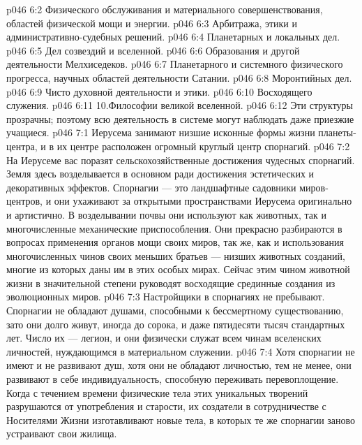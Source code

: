 \vs p046 6:2 \bibnobreakspace Физического обслуживания и материального совершенствования, областей физической мощи и энергии.
\vs p046 6:3 \bibnobreakspace Арбитража, этики и административно\hyp{}судебных решений.
\vs p046 6:4 \bibnobreakspace Планетарных и локальных дел.
\vs p046 6:5 \bibnobreakspace Дел созвездий и вселенной.
\vs p046 6:6 \bibnobreakspace Образования и другой деятельности Мелхиседеков.
\vs p046 6:7 \bibnobreakspace Планетарного и системного физического прогресса, научных областей деятельности Сатании.
\vs p046 6:8 \bibnobreakspace Моронтийных дел.
\vs p046 6:9 \bibnobreakspace Чисто духовной деятельности и этики.
\vs p046 6:10 \bibnobreakspace Восходящего служения.
\vs p046 6:11 10.Философии великой вселенной.
\vs p046 6:12 \pc Эти структуры прозрачны; поэтому всю деятельность в системе могут наблюдать даже приезжие учащиеся.
\vs p046 7:1  Иерусема занимают низшие исконные формы жизни планеты\hyp{}центра, и в их центре расположен огромный круглый центр спорнагий.
\vs p046 7:2 На Иерусеме вас поразят сельскохозяйственные достижения чудесных спорнагий. Земля здесь возделывается в основном ради достижения эстетических и декоративных эффектов. Спорнагии --- это ландшафтные садовники миров\hyp{}центров, и они ухаживают за открытыми пространствами Иерусема оригинально и артистично. В возделывании почвы они используют как животных, так и многочисленные механические приспособления. Они прекрасно разбираются в вопросах применения органов мощи своих миров, так же, как и использования многочисленных чинов своих меньших братьев --- низших животных созданий, многие из которых даны им в этих особых мирах. Сейчас этим чином животной жизни в значительной степени руководят восходящие срединные создания из эволюционных миров.
\vs p046 7:3 Настройщики в спорнагиях не пребывают. Спорнагии не обладают душами, способными к бессмертному существованию, зато они долго живут, иногда до сорока, и даже пятидесяти тысяч стандартных лет. Число их --- легион, и они физически служат всем чинам вселенских личностей, нуждающимся в материальном служении.
\vs p046 7:4 \pc Хотя спорнагии не имеют и не развивают душ, хотя они не обладают личностью, тем не менее, они развивают в себе индивидуальность, способную переживать перевоплощение. Когда с течением времени физические тела этих уникальных творений разрушаются от употребления и старости, их создатели в сотрудничестве с Носителями Жизни изготавливают новые тела, в которых те же спорнагии заново устраивают свои жилища.
